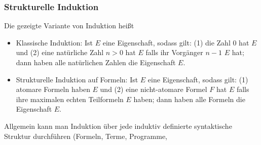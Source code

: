 \documentclass[aspectratio=1610,onlymath]{beamer}
\begin{document}
\begin{frame}\frametitle{Strukturelle Induktion}

Die gezeigte Variante von Induktion heißt 
\begin{itemize}
\item \alert{Klassische Induktion:} Ist $E$ eine Eigenschaft, sodass gilt:
(1) die Zahl $0$ hat $E$ und (2) eine natürliche Zahl $n>0$ hat $E$ falls ihr Vorgänger $n-1$ $E$ hat;
dann haben alle natürlichen Zahlen die Eigenschaft $E$.
\item \alert{Strukturelle Induktion auf Formeln:} Ist $E$ eine Eigenschaft, sodass gilt:
(1) atomare Formeln haben $E$ und (2) eine nicht-atomare Formel $F$ hat $E$ falls ihre maximalen echten Teilformeln $E$ haben;
dann haben alle Formeln die Eigenschaft $E$.
\end{itemize}
Allgemein kann man Induktion über jede induktiv definierte syntaktische Struktur durchführen (Formeln, Terme, Programme, \ghost{\ldots)}\medskip\pause


\end{frame}
\end{document}
